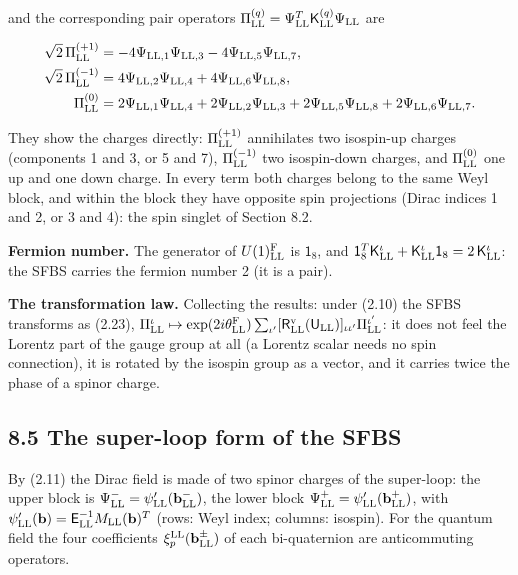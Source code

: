 \documentclass[
  10pt,
]{article}
\begin{document}
and the corresponding pair operators
\(\Pi^{(q)}_{\rm LL}=\Psi^T_{\rm LL}\mathsf K^{(q)}_{\rm LL}\Psi_{\rm LL}\)
are

\[\begin{aligned}
\sqrt2\,\Pi^{(+1)}_{\rm LL}&=-4\Psi_{{\rm LL},1}\Psi_{{\rm LL},3}-4\Psi_{{\rm LL},5}\Psi_{{\rm LL},7},\\
\sqrt2\,\Pi^{(-1)}_{\rm LL}&=4\Psi_{{\rm LL},2}\Psi_{{\rm LL},4}+4\Psi_{{\rm LL},6}\Psi_{{\rm LL},8},\\
\Pi^{(0)}_{\rm LL}&=2\Psi_{{\rm LL},1}\Psi_{{\rm LL},4}+2\Psi_{{\rm LL},2}\Psi_{{\rm LL},3}+2\Psi_{{\rm LL},5}\Psi_{{\rm LL},8}+2\Psi_{{\rm LL},6}\Psi_{{\rm LL},7}.
\end{aligned}\]

They show the charges directly: \(\Pi^{(+1)}_{\rm LL}\) annihilates two
isospin-up charges (components 1 and 3, or 5 and 7),
\(\Pi^{(-1)}_{\rm LL}\) two isospin-down charges, and
\(\Pi^{(0)}_{\rm LL}\) one up and one down charge. In every term both
charges belong to the same Weyl block, and within the block they have
opposite spin projections (Dirac indices 1 and 2, or 3 and 4): the spin
singlet of Section 8.2.

\textbf{Fermion number.} The generator of \(U(1)^{\rm F}_{\rm LL}\) is
\(\mathsf 1_8\), and
\(\mathsf 1_8^T\mathsf K^\iota_{\rm LL}+\mathsf K^\iota_{\rm LL}\mathsf 1_8=2\,\mathsf K^\iota_{\rm LL}\):
the SFBS carries the fermion number 2 (it is a pair).

\textbf{The transformation law.} Collecting the results: under (2.10)
the SFBS transforms as (2.23),
\(\Pi^\iota_{\rm LL}\mapsto\exp(2i\theta^{\rm F}_{\rm LL})\sum_{\iota'}[\mathsf R^{\rm v}_{\rm LL}(\mathsf U_{\rm LL})]_{\iota\iota'}\Pi^{\iota'}_{\rm LL}\):
it does not feel the Lorentz part of the gauge group at all (a Lorentz
scalar needs no spin connection), it is rotated by the isospin group as
a vector, and it carries twice the phase of a spinor charge.

\hypertarget{the-super-loop-form-of-the-sfbs}{%
\subsection{8.5 The super-loop form of the
SFBS}\label{the-super-loop-form-of-the-sfbs}}

By (2.11) the Dirac field is made of two spinor charges of the
super-loop: the upper block is
\(\Psi^-_{\rm LL}=\psi'_{\rm LL}(\mathbf b^-_{\rm LL})\), the lower
block \(\Psi^+_{\rm LL}=\psi'_{\rm LL}(\mathbf b^+_{\rm LL})\), with
\(\psi'_{\rm LL}(\mathbf b)=\mathsf E^{-1}_{\rm LL}M_{\rm LL}(\mathbf b)^T\)
(rows: Weyl index; columns: isospin). For the quantum field the four
coefficients \(\xi^{\rm LL}_p(\mathbf b^\pm_{\rm LL})\) of each
bi-quaternion are anticommuting operators.
\end{document}
